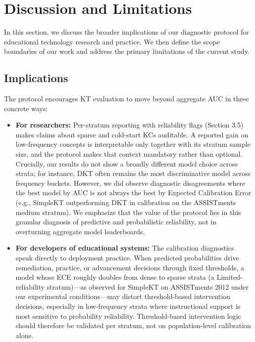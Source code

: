 \section{Discussion and Limitations}
\label{sec:discussion}
In this section, we discuss the broader implications of our diagnostic protocol for educational technology research and practice. We then define the scope boundaries of our work and address the primary limitations of the current study.

\subsection{Implications}
The protocol encourages KT evaluation to move beyond aggregate AUC in three concrete ways:
\begin{itemize}
    \item \textbf{For researchers:} Per-stratum reporting with reliability flags (Section 3.5) makes claims about sparse and cold-start KCs auditable. A reported gain on low-frequency concepts is interpretable only together with its stratum sample size, and the protocol makes that context mandatory rather than optional. Crucially, our results do not show a broadly different model choice across strata; for instance, DKT often remains the most discriminative model across frequency buckets. However, we did observe diagnostic disagreements where the best model by AUC is not always the best by Expected Calibration Error (e.g., SimpleKT outperforming DKT in calibration on the ASSISTments medium stratum). We emphasize that the value of the protocol lies in this granular diagnosis of predictive and probabilistic reliability, not in overturning aggregate model leaderboards.
    \item \textbf{For developers of educational systems:} The calibration diagnostics speak directly to deployment practice. When predicted probabilities drive remediation, practice, or advancement decisions through fixed thresholds, a model whose ECE roughly doubles from dense to sparse strata (a Limited-reliability stratum)---as observed for SimpleKT on ASSISTments 2012 under our experimental conditions---may distort threshold-based intervention decisions, especially in low-frequency strata where instructional support is most sensitive to probability reliability. Threshold-based intervention logic should therefore be validated per stratum, not on population-level calibration alone.

\end{itemize}
